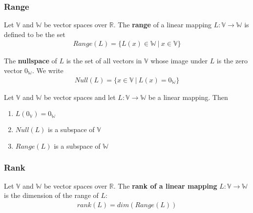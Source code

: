 \documentclass[a4paper,9pt]{extarticle}
\begin{document}
\begin{multicols*}{2}

\subsubsection{Range}
Let $\mathbb{V}$ and $\mathbb{W}$ be vector spaces over $\mathbb{R}$. The \textbf{range} of a linear mapping $L: \mathbb{V} \to \mathbb{W}$ is defined to be the set
\begin{equation} \label{4.5-1}
    \begin{split}
        Range(L) = \{L(x) \in \mathbb{W} \> | \> x \in \mathbb{V}\}
    \end{split}
\end{equation}

\noindent The \textbf{nullspace} of $L$ is the set of all vectors in $\mathbb{V}$ whose image under $L$ is the zero vector $0_{\mathbb{W}}$. We write
\begin{equation} \label{4.5-2}
    \begin{split}
        Null(L) = \{x \in \mathbb{V} \> | \> L(x) = 0_{\mathbb{W}}\}
    \end{split}
\end{equation}

Let $\mathbb{V}$ and $\mathbb{W}$ be vector spaces and let $L : \mathbb{V} \to \mathbb{W}$ be a linear mapping. Then
\begin{enumerate}[label=\bfseries (\arabic*)] \itemsep0pt \parskip0pt 
    \item $L(0_{\mathbb{V}}) = 0_{\mathbb{W}}$
    \item $Null(L)$ is a subspace of $\mathbb{V}$
    \item $Range(L)$ is a subspace of $\mathbb{W}$
\end{enumerate}


\subsubsection{Rank}
Let $\mathbb{V}$ and $\mathbb{W}$ be vector spaces over $\mathbb{R}$. The \textbf{rank of a linear mapping} $L: \mathbb{V} \to \mathbb{W}$ is the dimension of the range of $L$:
\begin{equation} \label{4.5-3}
    \begin{split}
        rank(L) = dim(Range(L))
    \end{split}
\end{equation}


\end{multicols*}
\end{document}
